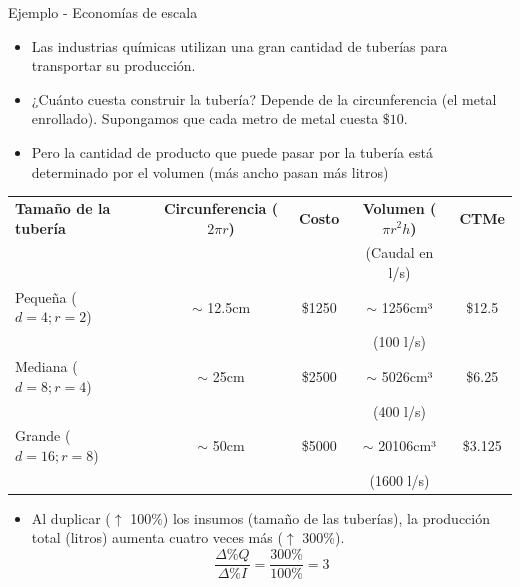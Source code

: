 \documentclass{beamer}
\begin{document}
\begin{frame}{Ejemplo - Economías de escala}
    \begin{itemize}
        \item Las industrias químicas utilizan una gran cantidad de tuberías para transportar su producción. 
        \item ¿Cuánto cuesta construir la tubería? Depende de la circunferencia (el metal enrollado). Supongamos que cada metro de metal cuesta $\$10$. 
        \item Pero la cantidad de producto que puede pasar por la tubería está determinado por el volumen (más ancho pasan más litros)
    \end{itemize}

    \begin{table}[h]
    \centering
    \renewcommand{\arraystretch}{1} %
    \begin{adjustbox}{width=0.8\textwidth}
    \begin{tabular}{lcccc}
        \toprule
        \textbf{Tamaño de la tubería} & \textbf{Circunferencia (\(2\pi r\))} & \textbf{Costo} & \textbf{Volumen (\(\pi r^2h\))} & \textbf{CTMe} \\
        &  &  & (Caudal en l/s) & \\
        \midrule
        Pequeña ($d =4; r=2$) & $\sim$ 12.5cm & \$1250 & $\sim$ 1256cm³ & \$12.5 \\
        &  & & (100 l/s) & \\
        Mediana ($d =8; r=4$) & $\sim$ 25cm & \$2500  & $\sim$ 5026cm³ & \$6.25 \\
        &  & & (400 l/s) & \\
        Grande ($d =16; r=8$) & $\sim$ 50cm & \$5000  & $\sim$ 20106cm³ & \$3.125\\
        &  & & (1600 l/s) & \\
        \bottomrule
    \end{tabular}
    \end{adjustbox}
    \end{table}
    \centering
    \begin{itemize}
    \item Al duplicar ($\uparrow$ 100\%) los insumos (tamaño de las tuberías), la producción total (litros) aumenta cuatro veces más ($\uparrow$ 300\%). 
    \[ \frac{\Delta \% Q}{\Delta \% I} =\frac{ 300\% }{100\%}=3\]
    \end{itemize}
\end{frame}
\end{document}
